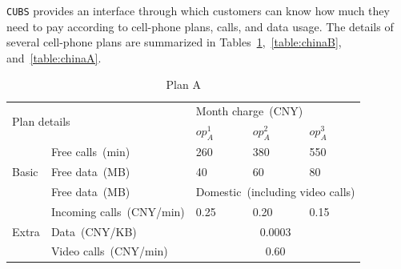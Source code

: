 \documentclass[10pt,journal,compsoc]{IEEEtran}
\begin{document}
\texttt{CUBS} provides an interface through which customers can know how much they need to pay according to cell-phone plans, calls, and data usage.
The details of several cell-phone plans are summarized in Tables~\ref{table:chinaC},~\ref{table:chinaB}, and~\ref{table:chinaA}.
\begin{table}[h]
  \caption{Plan A}
  \label{table:chinaC}
  \centering
  \begin{tabular}{lllll} \toprule
  \multicolumn{2}{l}{\multirow{2}{*}{Plan details}}  &\multicolumn{3}{l}{Month charge~(CNY)} \\ \cmidrule(lr){3-5}
  \multicolumn{2}{l}{}                                  &$op_A^1$  &$op_A^2$  &$op_A^3$ \\ \midrule
   \multirow{3}{*}{Basic} &Free calls~(min)  &260  &380  &550 \\
                                          &Free data~(MB)  &40 &60 &80 \\
                                            &Free data~(MB)  &\multicolumn{3}{l}{Domestic~(including video calls)} \\ \midrule
   \multirow{3}{*}{Extra} &Incoming calls~(CNY/min)  &0.25 &0.20  &0.15 \\
                                            &Data~(CNY/KB)  &\multicolumn{3}{c}{0.0003} \\
                                            &Video calls~(CNY/min)  &\multicolumn{3}{c}{0.60} \\ \bottomrule
  \end{tabular}
\end{table}

\begin{table}[hbtp]
  \caption{Plan B}
  \label{table:chinaB}
  \centering
{}
\end{table}
\end{document}
